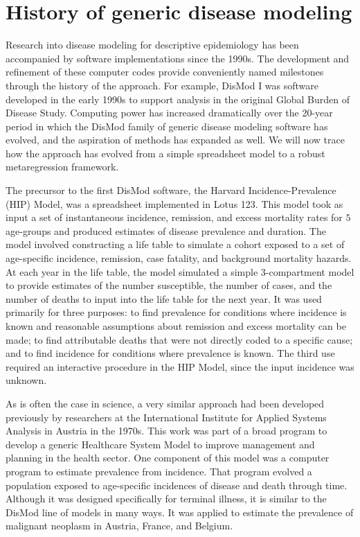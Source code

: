 \section{History of generic disease modeling}

Research into disease modeling for descriptive
epidemiology has been accompanied by software implementations since
the 1990s.  The development and refinement of these computer codes
provide conveniently named milestones through the history of the
approach.  For example, DisMod I was software developed in the early
1990s to support analysis in the original Global Burden of Disease
Study.  Computing power has increased dramatically over the 20-year
period in which the DisMod family of generic disease modeling software
has evolved, and the aspiration of methods has expanded as well. We will
now trace how the approach has evolved from a simple spreadsheet model
to a robust metaregression framework.

The precursor to the first DisMod software, the Harvard Incidence-Prevalence
(HIP) Model, was a spreadsheet implemented in Lotus 123.
\cite{Murray_Quantifying_1994} This model took as input a set of
instantaneous incidence, remission, and excess mortality rates for $5$
age-groups and produced estimates of disease prevalence and duration.
The model involved constructing a life table to simulate a cohort
exposed to a set of age-specific incidence, remission, case fatality,
and background mortality hazards. At each year in the life table, the
model simulated a simple $3$-compartment model to provide estimates of
the number susceptible, the number of cases, and the number of deaths
to input into the life table for the next year.  It was used primarily
for three purposes: to find prevalence for conditions where incidence
is known and reasonable assumptions about remission and excess
mortality can be made; to find attributable deaths that were not
directly coded to a specific cause; and to find incidence for
conditions where prevalence is known.  The third use required an
interactive procedure in the HIP Model, since the input incidence was
unknown.

As is often the case in science, a very similar approach had been
developed previously by researchers at the International Institute
for Applied Systems Analysis in Austria in the 1970s.\cite{international_institute_for_applied_systems_analysis._estimation_1977} This work was
part of a broad program to develop a generic Healthcare System Model
to improve management and planning in the health sector. One component
of this model was a computer program to estimate prevalence from
incidence. That program evolved a population
exposed to age-specific incidences of disease and death through time.
Although it was designed specifically for terminal illness, it is
similar to the DisMod line of models in many ways. It was applied to
estimate the prevalence of malignant neoplasm in Austria, France, and
Belgium.


